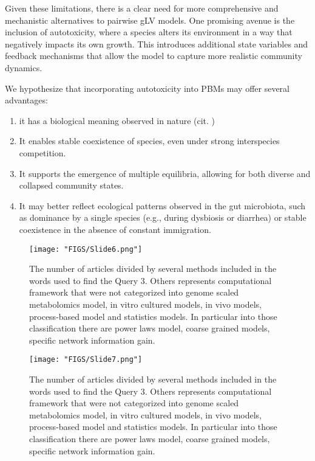 \documentclass[11pt,a4paper,fleqn]{article}
\begin{document}
Given these limitations, there is a clear need for more comprehensive and mechanistic alternatives to pairwise gLV models. 
One promising avenue is the inclusion of autotoxicity, where a species alters its environment in a way that negatively impacts its own growth. This introduces additional state variables and feedback mechanisms that allow the model to capture more realistic community dynamics.

We hypothesize that incorporating autotoxicity into PBMs may offer several advantages:

\begin{enumerate}
\item it has a biological meaning observed in nature (cit. )
\item It enables stable coexistence of species, even under strong interspecies competition.
\item It supports the emergence of multiple equilibria, allowing for both diverse and collapsed community states.
\item It may better reflect ecological patterns observed in the gut microbiota, such as dominance by a single species (e.g., during dysbiosis or diarrhea) or stable coexistence in the absence of constant immigration.
\end{enumerate}
\begin{figure}[h]
	    \centering
    \texttt{[image: "FIGS/Slide6.png"]} %
    \caption{ \label{fig:sample2} The number of articles divided by several methods included in the words used to find the Query 3. Others represents computational framework that were not categorized into genome scaled metabolomics model, in vitro cultured models, in vivo models, process-based model and statistics models. In particular into those classification there are power laws model, coarse grained models, specific network information gain.}
   
\end{figure}


\begin{figure}[h]
	    \centering
    \texttt{[image: "FIGS/Slide7.png"]} %
    \caption{\label{fig:sample3} The number of articles divided by several methods included in the words used to find the Query 3. Others represents computational framework that were not categorized into genome scaled metabolomics model, in vitro cultured models, in vivo models, process-based model and statistics models. In particular into those classification there are power laws model, coarse grained models, specific network information gain.}
    
\end{figure}
\end{document}
